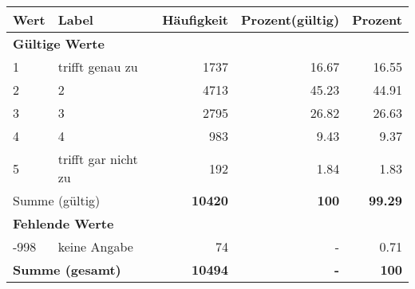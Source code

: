      \begin{longtable}{lXrrr}
     \toprule
     \textbf{Wert} & \textbf{Label} & \textbf{Häufigkeit} & \textbf{Prozent(gültig)} & \textbf{Prozent} \\
     \endhead
     \midrule
     \multicolumn{5}{l}{\textbf{Gültige Werte}}\\

     1 &
     \multicolumn{1}{X}{ trifft genau zu   } &


       \num{1737} &
       \num[round-mode=places,round-precision=2]{16,67} &
         \num[round-mode=places,round-precision=2]{16,55} \\

     2 &
     \multicolumn{1}{X}{ 2   } &


       \num{4713} &
       \num[round-mode=places,round-precision=2]{45,23} &
         \num[round-mode=places,round-precision=2]{44,91} \\

     3 &
     \multicolumn{1}{X}{ 3   } &


       \num{2795} &
       \num[round-mode=places,round-precision=2]{26,82} &
         \num[round-mode=places,round-precision=2]{26,63} \\

     4 &
     \multicolumn{1}{X}{ 4   } &


       \num{983} &
       \num[round-mode=places,round-precision=2]{9,43} &
         \num[round-mode=places,round-precision=2]{9,37} \\

     5 &
     \multicolumn{1}{X}{ trifft gar nicht zu   } &


       \num{192} &
       \num[round-mode=places,round-precision=2]{1,84} &
         \num[round-mode=places,round-precision=2]{1,83} \\
     \midrule
     \multicolumn{2}{l}{Summe (gültig)} &
       \textbf{\num{10420}} &
     \textbf{100} &
       \textbf{\num[round-mode=places,round-precision=2]{99,29}} \\
     \multicolumn{5}{l}{\textbf{Fehlende Werte}}\\
       -998 &
       keine Angabe &
         \num{74} &
        - &
         \num[round-mode=places,round-precision=2]{0,71} \\
     \midrule
     \multicolumn{2}{l}{\textbf{Summe (gesamt)}} &
          \textbf{\num{10494}} &
        \textbf{-} &
        \textbf{100} \\
     \bottomrule
     \end{longtable}
     
